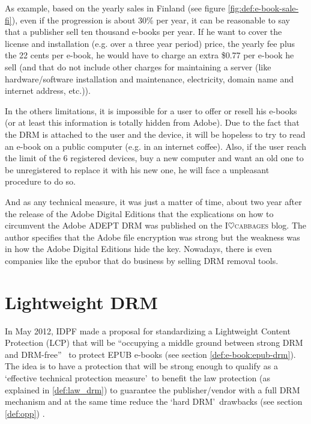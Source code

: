 \documentclass[11pt,a4paper,oneside]{memoir}
\begin{document}
As example,\label{def:e-book-sale-fi} based on the yearly sales in Finland (see figure \ref{fig:def:e-book-sale-fi}), even if the progression is about 30\% per year, it can be reasonable to say that a publisher sell ten thousand e-books per year. If he want to cover the license and installation (e.g. over a three year period) price, the yearly fee plus the 22 cents per e-book, he would have to charge an extra \$0.77 per e-book he sell (and that do not include other charges for maintaining a server (like hardware/software installation and maintenance, electricity, domain name and internet address, etc.)).

In the others limitations, it is impossible for a user to offer or resell his e-books (or at least this information is totally hidden from Adobe). Due to the fact that the DRM is attached to the user and the device, it will be hopeless to try to read an e-book on a public computer (e.g. in an internet coffee). Also, if the user reach the limit of the 6 registered devices, buy a new computer and want an old one to be unregistered to replace it with his new one, he will face a unpleasant procedure to do so.

And as any technical measure, it was just a matter of time, about two year after the release of the Adobe Digital Editions that the explications on how to circumvent the Adobe ADEPT DRM was published \cite{icabbages:adobe_drm_hack} on the I$\heartsuit$\textsc{cabbages} blog\label{def:adobe_drm_crack}. The author specifies that the Adobe file encryption was strong but the weakness was in how the Adobe Digital Editions hide the key. Nowadays, there is even companies like the epubor \cite{epubor:adobe_drm_removal} that do business by selling DRM removal tools. 


\section{Lightweight DRM}\label{def:idpf_light}

In May 2012, IDPF made a proposal for standardizing a Lightweight Content Protection (LCP) that will be \textquotedblleft occupying a middle ground between strong DRM and DRM-free\textquotedblright ~\cite{idpf:drm-rfc} to protect EPUB e-books (see section \vref{def:e-book:epub-drm}).
The idea is to have a protection that will be strong enough to qualify as a \textquoteleft effective technical protection measure\textquoteright ~to benefit the law protection (as explained in \vref{def:law_drm}) to guarantee the publisher/vendor with a full DRM mechanism and at the same time reduce the \textquoteleft hard DRM\textquoteright ~drawbacks (see section \vref{def:opp}) \cite{idpf:lcp-uc}.
\end{document}
